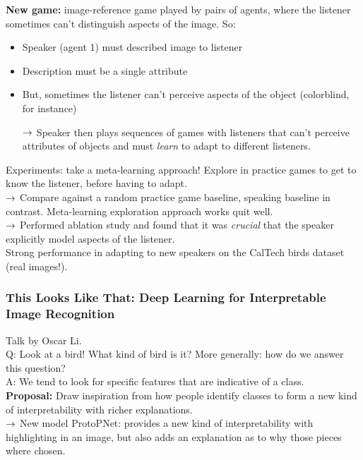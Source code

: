 {\bf New game:} image-reference game played by pairs of agents, where the listener sometimes can't distinguish aspects of the image. So:
\begin{itemize}
    \item Speaker (agent 1) must described image to listener
    \item Description must be a single attribute
    \item But, sometimes the listener can't perceive aspects of the object (colorblind, for instance) 
    
    $\rightarrow$ Speaker then plays sequences of games with listeners that can't perceive attributes of objects and must {\it learn} to adapt to different listeners.
\end{itemize}

Experiments: take a meta-learning approach! Explore in practice games to get to know the listener, before having to adapt. \\

$\rightarrow$ Compare against a random practice game baseline, speaking baseline in contrast. Meta-learning exploration approach works quit well.\\

$\rightarrow$ Performed ablation study and found that it was {\it crucial} that the speaker explicitly model aspects of the listener. \\

Strong performance in adapting to new speakers on the CalTech birds dataset (real images!). 

\subsubsection{This Looks Like That: Deep Learning for Interpretable Image Recognition \cite{chen2019looks}}

Talk by Oscar Li. \\

Q: Look at a bird! What kind of bird is it? More generally: how do we answer this question? \\

A: We tend to look for specific features that are indicative of a class. \\

{\bf Proposal:} Draw inspiration from how people identify classes to form a new kind of interpretability with richer explanations. \\

$\rightarrow$ New model ProtoPNet: provides a new kind of interpretability with highlighting in an image, but also adds an explanation as to why those pieces where chosen. \\

